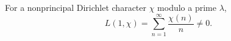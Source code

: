 For a nonprincipal Dirichlet character $\chi$ modulo a prime $\lambda$,
$$L(1, \chi) = \sum_{n=1}^{\infty} \frac{\chi(n)}{n} \neq 0.$$

